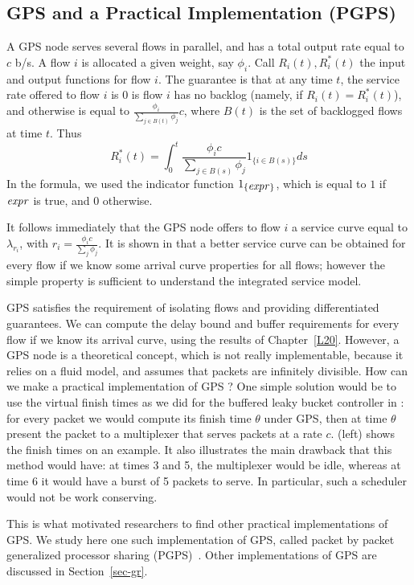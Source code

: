 \subsection{GPS and a Practical Implementation (PGPS)}

A GPS node serves several flows in parallel, and has a total
output rate equal to $c$ b/s. A flow $i$ is allocated a given
weight, say $\phi_i$. Call $R_i(t), R^*_i(t)$ the input and output
functions for flow $i$. The guarantee is that at any time $t$, the
service rate offered to flow $i$ is 0 is flow $i$ has no backlog
(namely, if $R_i(t)=R_i^*(t)$), and otherwise is equal to
$\frac{\phi_i}{\sum_{j \in B(t)} \phi_{j}}c$, where $B(t)$ is the
set of backlogged flows at time $t$. Thus
 $$R^*_i(t) = \int_0^t \frac{\phi_i c}{\sum_{j \in B(s)} \phi_{j}} 1_{\{i \in B(s)\}}ds
 $$
 In the formula, we used the indicator function
 $1_{\{\mbox{\emph{expr}}\}}$, which is equal to $1$ if $\mbox{\emph{expr}}$ is
 true, and $0$ otherwise.

It follows immediately that the GPS node offers to flow $i$ a
service curve equal to $\lambda_{r_i}$, with $r_i=\frac{\phi_i
c}{\sum_{j} \phi_{j}}$. It is shown in \cite{pg94} that a better
service curve can be obtained for every flow if we know some
arrival curve properties for all flows; however the simple
property is sufficient to understand the integrated service model.

GPS satisfies the requirement of isolating flows and providing
differentiated guarantees. We can compute the delay bound and
buffer requirements for every flow if we know its arrival curve,
using the results of Chapter~\ref{L20}. However, a GPS node is a
theoretical concept, which is not really implementable, because it
relies on a fluid model, and assumes that packets are infinitely
divisible. How can we make a practical implementation of GPS ? One
simple solution would be to use the virtual finish times as we did
for the buffered leaky bucket controller in : for
every packet we would compute its finish time $\theta$ under GPS,
then at time $\theta$ present the packet to a multiplexer that
serves packets at a rate $c$.  (left) shows the
finish times on an example. It also illustrates the main drawback
that this method would have: at times 3 and 5, the multiplexer
would be idle, whereas at time 6 it would have a burst of 5
packets to serve. In particular, such a scheduler would not be
work conserving.

This is what motivated researchers to find other practical
implementations of GPS. We study here one such implementation of
GPS, called
packet by packet generalized processor sharing (PGPS)~\cite{pg93}. %
%
Other implementations of GPS are discussed in
Section~\ref{sec-gr}.

